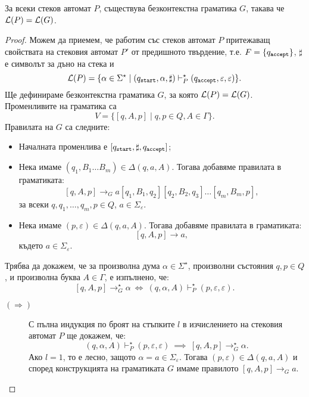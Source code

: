 \begin{framed}
  \begin{lemma}
    За всеки стеков автомат $P$, съществува безконтекстна граматика $G$, такава че $\mathcal{L}(P) = \mathcal{L}(G)$.
  \end{lemma}
\end{framed}
\begin{proof}
  Можем да приемем, че работим със стеков автомат $P$ притежаващ свойствата на стековия автомат $P'$ от предишното твърдение, т.е.
  $F = \{q_{\texttt{accept}}\}$, $\sharp$ е символът за дъно на стека и 
  \[\mathcal{L}(P) = \{\alpha \in \Sigma^\star \mid (q_{\texttt{start}}, \alpha, \sharp) \vdash^\star_P (q_{\texttt{accept}}, \varepsilon, \varepsilon)\}.\]
  Ще дефинираме безконтекстна граматика $G$, за която $\mathcal{L}(P) = \mathcal{L}(G)$.
  Променливите на граматика са 
  \[V = \{[q,A,p] \mid q,p \in Q, A \in \Gamma\}.\]
  Правилата на $G$ са следните:
  \begin{itemize}
  \item
    Началната променлива е $[q_{\texttt{start}},\sharp,q_{\texttt{accept}}]$;
  \item
    Нека имаме $(q_1,B_1\dots B_m) \in \Delta(q, a, A)$.
    Тогава добавяме правилата в граматиката:
    \[[q,A,p] \to_G a[q_1,B_1,q_2][q_2,B_2,q_3]\dots [q_m,B_m,p],\]
    за всеки $q,q_1,\dots,q_{m},p \in Q$, $a \in \Sigma_\varepsilon$.
  \item
    Нека имаме $(p,\varepsilon) \in \Delta(q,a,A)$.
    Тогава добавяме правилата в граматиката:
    \[[q,A,p] \to a,\]
    където $a \in \Sigma_\varepsilon$.
  \end{itemize}
  Трябва да докажем, че за произволна дума $\alpha \in \Sigma^\star$, произволни състояния $q,p \in Q$,
  и произволна буква $A \in \Gamma$, е изпълнено, че:
  \[[q,A,p] \rightarrow^\star_G \alpha\ \Leftrightarrow\ (q,\alpha,A) \vdash^\star_{P} (p,\varepsilon,\varepsilon).\]
  \begin{description}
  \item[$(\Rightarrow)$]
    С пълна индукция по броят на стъпките $l$ в изчислението на стековия автомат $P$ ще докажем, че:
    \[(q,\alpha,A) \vdash^\star_P (p,\varepsilon,\varepsilon)\ \implies\ [q,A,p] \to^\star_G \alpha.\]
    Ако $l = 1$, то е лесно, защото $\alpha = a \in \Sigma_\varepsilon$.
    Тогава $(p,\varepsilon) \in \Delta(q,a,A)$ и според конструкцията на граматиката $G$ имаме правилото $[q,A,p] \to_G a$.
    

\end{description}
\end{proof}

